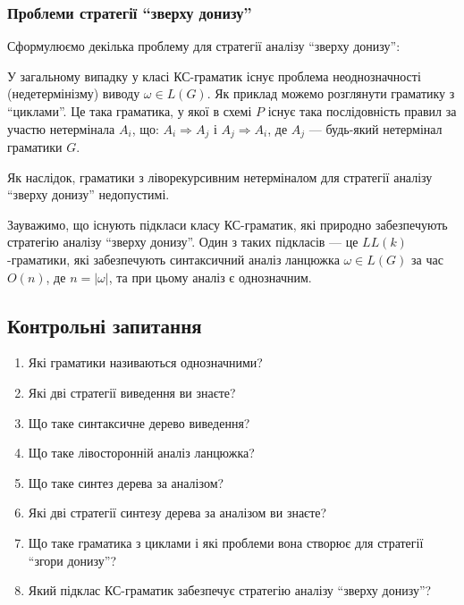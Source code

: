\subsubsection{Проблеми стратегії ``зверху донизу''}

Сформулюємо декілька проблему для стратегії аналізу ``зверху донизу'': \medskip

У загальному випадку у класі КС-граматик існує проблема неоднозначності (недетермінізму) виводу $\omega \in L(G)$. Як приклад можемо розглянути граматику з ``циклами''. Це така граматика, у якої в схемі $P$ існує така послідовність правил за участю нетермінала $A_i$, що: $A_i \Rightarrow A_j$ і $A_j \Rightarrow A_i$, де $A_j$ --- будь-який нетермінал граматики $G$. \medskip

Як наслідок, граматики з ліворекурсивним нетерміналом для стратегії аналізу ``зверху донизу'' недопустимі. \medskip %

Зауважимо, що існують підкласи класу КС-граматик, які природно забезпечують стратегію аналізу ``зверху донизу''. Один з таких підкласів --- це $LL(k)$-граматики, які забезпечують синтаксичний аналіз ланцюжка $\omega \in L(G)$ за час $O(n)$, де $n = \vert \omega \vert$, та при цьому аналіз є однозначним.

\subsection{Контрольні запитання}

\begin{enumerate}
	\item Які граматики називаються однозначними? %
	\item Які дві стратегії виведення ви знаєте? %
	\item Що таке синтаксичне дерево виведення? %
	\item Що таке лівосторонній аналіз ланцюжка? %
	\item Що таке синтез дерева за аналізом? %
	\item Які дві стратегії синтезу дерева за аналізом ви знаєте? %
	\item Що таке граматика з циклами і які проблеми вона створює для стратегії ``згори донизу''? %
	\item Який підклас КС-граматик забезпечує стратегію аналізу ``зверху донизу''? %
\end{enumerate}
